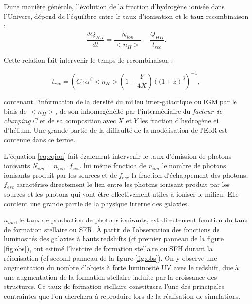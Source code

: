 Dune manière générale, l'évolution de la fraction d'hydrogène ionisée dans l'Univers, dépend de l'équilibre entre le taux d'ionisation et le taux recombinaison \citep{0004-637X-514-2-648, RevModPhys.81.1405} :
\begin{equation}
\frac{dQ_{HII}}{dt} = \frac{\dot{N}_{ion}}{ <n_H>} - \frac{Q_{HII}}{t_{rec}}.
\label{eq:eqion}
\end{equation}

Cette relation fait intervenir le temps de recombinaison :

\begin{equation}
t_{rec} = \left( C\cdot \alpha^\beta <n_H> \left( 1+\frac{Y}{4X}\right) \left((1+z\right)^3  \right)^{-1}, 
\end{equation}

contenant l'information de la densité du milieu inter-galactique ou \ac{IGM} par le biais de $<n_H>$, de son inhomogénéité par l'intermédiaire du \textit{facteur de clumping} $C$ et de sa composition avec $X$ et $Y$ les fraction d'hydrogène et d'hélium.
Une grande partie de la difficulté de la modélisation de l'\ac{EoR} est contenue dans ce terme.

L'équation \ref{eq:eqion} fait également intervenir le taux d'émission de photons ionisants $\dot{N}_{ion}= \dot{n}_{ion} \cdot f_{esc}$, lui même fonction de $\dot{n}_{ion}$ le nombre de photons ionisants produit par les sources et de $f_{esc}$ la fraction d'échappement des photons. 
$f_{esc}$ caractérise directement le lien entre les photons ionisant produit par les sources et les photons qui vont être effectivement utiles à ioniser le milieu.
Elle contient une grande partie de la physique interne des galaxies.

$\dot{n}_{ion}$, le taux de production de photons ionisants, est directement fonction du taux de formation stellaire ou \ac{SFR}.
À partir de l'observation des fonctions de luminosités des galaxies à hauts redshifts (cf premier panneau de la figure \ref{fig:obs}), \cite{bouwens_reionization_2015} ont estimé l'histoire de formation stellaire ou \ac{SFH} durant la réionisation (cf second panneau de la figure \ref{fig:obs}).
On y observe une augmentation du nombre d'objets à forte luminosité UV avec le redshift, due à une augmentation de la formation stellaire induite par la croissance des structures.
Ce taux de formation stellaire constituera l'une des principales contraintes que l'on cherchera à reproduire lors de la réalisation de simulations.





